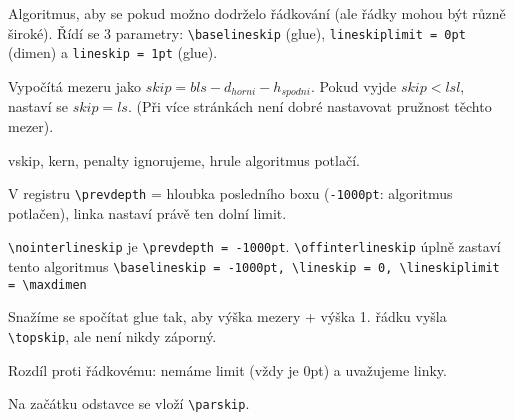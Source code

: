 \documentclass[12pt]{article}					%
\begin{document}
    \begin{definice}[Řádkování]
        Algoritmus, aby se pokud možno dodrželo řádkování (ale řádky mohou být různě široké). Řídí se 3 parametry: \verb|\baselineskip| (glue), \verb|lineskiplimit = 0pt| (dimen) a \verb|lineskip = 1pt| (glue).

        Vypočítá mezeru jako $skip = bls - d_{horni} - h_{spodni}$. Pokud vyjde $skip < lsl$, nastaví se $skip = ls$. (Při více stránkách není dobré nastavovat pružnost těchto mezer).

        vskip, kern, penalty ignorujeme, hrule algoritmus potlačí.

        \begin{poznamkain}
                V registru \verb|\prevdepth| = hloubka posledního boxu (\verb|-1000pt|: algoritmus potlačen), linka nastaví právě ten dolní limit.

                \verb|\nointerlineskip| je \verb|\prevdepth = -1000pt|. \verb|\offinterlineskip| úplně zastaví tento algoritmus \verb|\baselineskip = -1000pt, \lineskip = 0, \lineskiplimit = \maxdimen|
        \end{poznamkain}
    \end{definice}

    \begin{poznamka}
        Snažíme se spočítat glue tak, aby výška mezery + výška 1. řádku vyšla \verb|\topskip|, ale není nikdy záporný.

        Rozdíl proti řádkovému: nemáme limit (vždy je 0pt) a uvažujeme linky.
    \end{poznamka}


    \begin{poznamka}
        Na začátku odstavce se vloží \verb|\parskip|.
    \end{poznamka}
\end{document}
